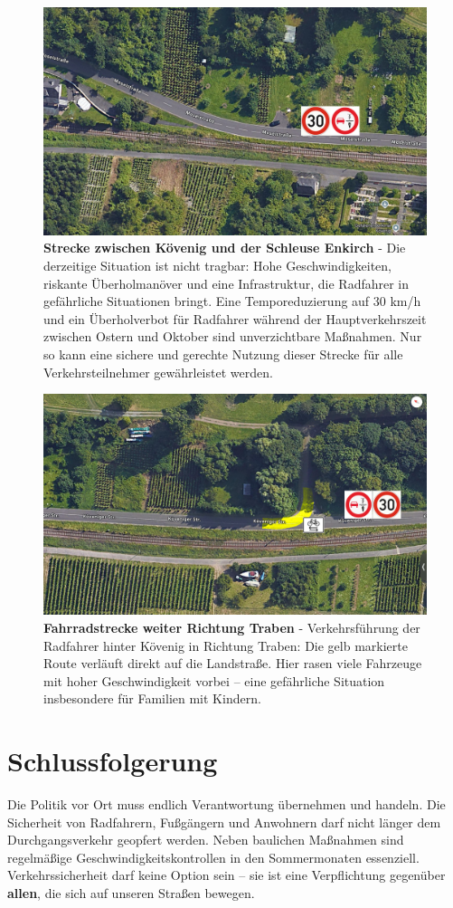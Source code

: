 	\begin{figure}[H]
		\centering
		\includegraphics[width=0.8\linewidth]{"bild4"}
		\caption[Strecke zwischen Kövenig und Schleuse Enkirch]{\textbf{Strecke zwischen Kövenig und der Schleuse Enkirch} - 	Die derzeitige Situation ist nicht tragbar: Hohe Geschwindigkeiten, riskante Überholmanöver und eine Infrastruktur, die Radfahrer in gefährliche Situationen bringt. Eine Temporeduzierung auf 30 km/h und ein Überholverbot für Radfahrer während der Hauptverkehrszeit zwischen Ostern und Oktober sind unverzichtbare Maßnahmen. Nur so kann eine sichere und gerechte Nutzung dieser Strecke für alle Verkehrsteilnehmer gewährleistet werden.}
		\label{fig:Schleuse-Koevenig}
	\end{figure}

	\begin{figure}[H]
		\centering
		\includegraphics[width=0.8\linewidth]{"bild5"}
		\caption[Fahrradstrecke weiter Richtung Traben]{\textbf{Fahrradstrecke weiter Richtung Traben} -  Verkehrsführung der Radfahrer hinter Kövenig in Richtung Traben: Die gelb markierte Route verläuft direkt auf die Landstraße. Hier rasen viele Fahrzeuge mit hoher Geschwindigkeit vorbei – eine gefährliche Situation insbesondere für Familien mit Kindern.}
		\label{fig:Koevenig-Traben}
	\end{figure}
	\section{Schlussfolgerung}
	Die Politik vor Ort muss endlich Verantwortung übernehmen und handeln. Die Sicherheit von Radfahrern, Fußgängern und Anwohnern darf nicht länger dem Durchgangsverkehr geopfert werden. Neben baulichen Maßnahmen sind regelmäßige Geschwindigkeitskontrollen in den Sommermonaten essenziell. Verkehrssicherheit darf keine Option sein – sie ist eine Verpflichtung gegenüber \textbf{allen}, die sich auf unseren Straßen bewegen.
	
	

